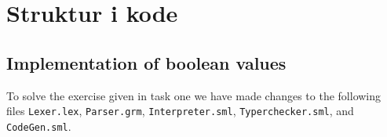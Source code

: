 \documentclass[11pt,a4paper,oneside]{report}
\begin{document}

\clearpage\maketitle
\thispagestyle{empty}

\clearpage\newpage
\thispagestyle{plain}



\section{Struktur i kode}
\subsection*{Implementation of boolean values}
To solve the exercise given in task one we have made changes to the following files \texttt{Lexer.lex}, \texttt{Parser.grm}, \texttt{Interpreter.sml}, \texttt{Typerchecker.sml}, and \texttt{CodeGen.sml}.
\end{document}
